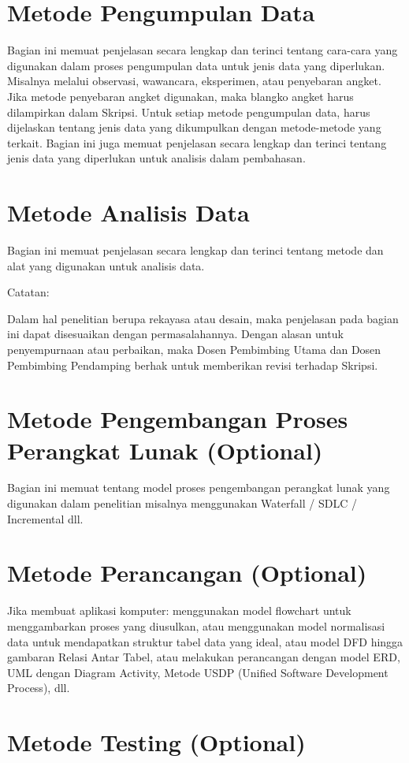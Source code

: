 \documentclass[oneside,listof=totoc]{scrbook}
\begin{document}
\section{Metode Pengumpulan Data}
Bagian ini memuat penjelasan secara lengkap dan terinci tentang cara-cara yang digunakan dalam proses pengumpulan data untuk jenis data yang diperlukan. Misalnya melalui observasi, wawancara, eksperimen, atau penyebaran angket. Jika metode penyebaran angket digunakan, maka blangko angket harus dilampirkan dalam Skripsi. Untuk setiap metode pengumpulan data, harus dijelaskan tentang jenis data yang dikumpulkan dengan metode-metode yang terkait. Bagian ini juga memuat penjelasan secara lengkap dan terinci tentang jenis data yang diperlukan untuk analisis dalam pembahasan.

\section{Metode Analisis Data}
Bagian ini memuat penjelasan secara lengkap dan terinci tentang metode dan alat yang digunakan untuk analisis data.

\noindent Catatan:

Dalam hal penelitian berupa rekayasa atau desain, maka penjelasan pada bagian ini dapat disesuaikan dengan permasalahannya. Dengan alasan untuk penyempurnaan atau perbaikan, maka Dosen Pembimbing Utama dan Dosen Pembimbing Pendamping berhak untuk memberikan revisi terhadap Skripsi.

\section{Metode Pengembangan Proses Perangkat Lunak (Optional)}
Bagian ini memuat tentang model proses pengembangan perangkat lunak yang digunakan dalam penelitian misalnya menggunakan Waterfall / SDLC / Incremental dll.

\section{Metode Perancangan (Optional)}
Jika membuat aplikasi komputer: menggunakan model flowchart untuk menggambarkan proses yang diusulkan, atau menggunakan model normalisasi data untuk mendapatkan struktur tabel data yang ideal, atau model DFD hingga gambaran Relasi Antar Tabel, atau melakukan perancangan dengan model ERD, UML dengan Diagram Activity, Metode USDP (Unified Software Development Process), dll.

\section{Metode Testing (Optional)}
\end{document}
